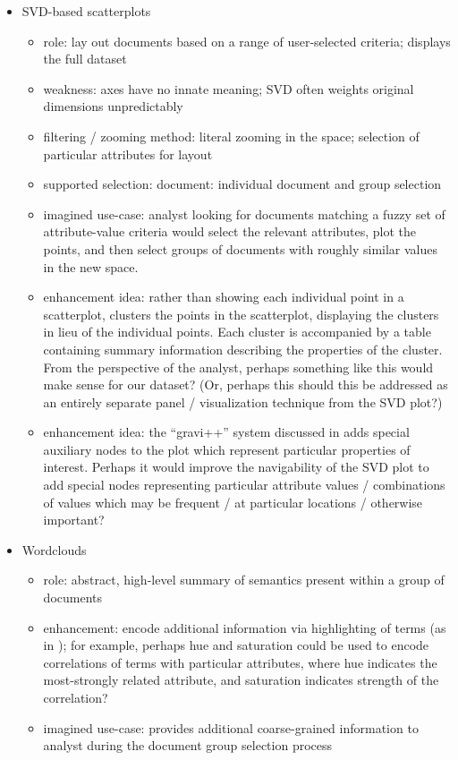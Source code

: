 \documentclass[11pt,letterpaper]{article}
\begin{document}
\begin{itemize}
\item SVD-based scatterplots
\begin{itemize}
\item role: lay out documents based on a range of user-selected criteria; displays the full dataset
\item weakness: axes have no innate meaning; SVD often weights original dimensions unpredictably
\item filtering / zooming method: literal zooming in the space; selection of particular attributes for layout
\item supported selection: document: individual document and group selection
\item imagined use-case: analyst looking for documents matching a fuzzy set of attribute-value criteria would select the relevant attributes, plot the points, and then select groups of documents with roughly similar values in the new space.
\item enhancement idea: rather than showing each individual point in a scatterplot, \cite{oelke_2009_visual_opinion_customer} clusters the points in the scatterplot, displaying the clusters in lieu of the individual points. Each cluster is accompanied by a table containing summary information describing the properties of the cluster. From the perspective of the analyst, perhaps something like this would make sense for our dataset? (Or, perhaps this should this be addressed as an entirely separate panel / visualization technique from the SVD plot?)
\item enhancement idea: the ``gravi++'' system discussed in \cite{rind_2010_interactive_information_visualization_ehr_review} adds special auxiliary nodes to the plot which represent particular properties of interest. Perhaps it would improve the navigability of the SVD plot to add special nodes representing particular attribute values / combinations of values which may be frequent / at particular locations / otherwise important?
\end{itemize}

\item Wordclouds
\begin{itemize}
\item role: abstract, high-level summary of semantics present within a group of documents
\item enhancement: encode additional information via highlighting of terms (as in \cite{cui_2011_context_word_cloud}); for example, perhaps hue and saturation could be used to encode correlations of terms with particular attributes, where hue indicates the most-strongly related attribute, and saturation indicates strength of the correlation?
\item imagined use-case: provides additional coarse-grained information to analyst during the document group selection process
\end{itemize}


\end{itemize}
\end{document}
